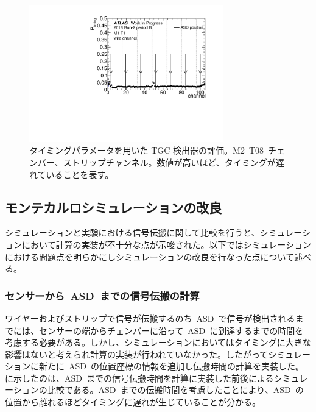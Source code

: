 \begin{figure}[H]
        \centering   
        \includegraphics[width=0.75\textwidth,page=21]{img/pdf5/master_timingplot_data.pdf}
        \caption[タイミングパラメータを用いた TGC 検出器の評価]{タイミングパラメータを用いた TGC 検出器の評価。M2~T08~チェンバー、ストリップチャンネル。数値が高いほど、タイミングが遅れていることを表す。}
        \label{fig:timingex}
\end{figure}

\subsection{モンテカルロシミュレーションの改良}
\label{sec:imp}
シミュレーションと実験における信号伝搬に関して比較を行うと、シミュレーションにおいて計算の実装が不十分な点が示唆された。以下ではシミュレーションにおける問題点を明らかにしシミュレーションの改良を行なった点について述べる。

\subsubsection{センサーから~ASD~までの信号伝搬の計算}
ワイヤーおよびストリップで信号が伝搬するのち~ASD~で信号が検出されるまでには、センサーの端からチェンバーに沿って~ASD~に到達するまでの時間を考慮する必要がある。しかし、シミュレーションにおいてはタイミングに大きな影響はないと考えられ計算の実装が行われていなかった。したがってシミュレーションに新たに~ASD~の位置座標の情報を追加し伝搬時間の計算を実装した。
に示したのは、ASD~までの信号伝搬時間を計算に実装した前後によるシミュレーションの比較である。ASD~までの伝搬時間を考慮したことにより、ASD~の位置から離れるほどタイミングに遅れが生じていることが分かる。

